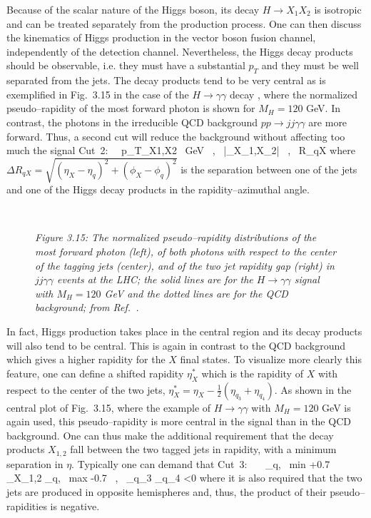 Because of the scalar nature of the Higgs boson, its decay $H \to X_1 X_2$ is
isotropic and can be treated separately from the production process. One can 
then discuss the kinematics of Higgs production in the vector boson fusion 
channel,
independently of the detection channel. Nevertheless, the Higgs decay products
should be observable, i.e. they must have a substantial $p_T$ and they must be
well separated from the jets. The decay products tend to be very central as is
exemplified in Fig.~3.15 in the case of the $H \to \gamma \gamma$ decay 
\cite{Zepp-gamma}, where
the normalized pseudo--rapidity of the most forward photon is shown for
$M_H=120$ GeV. In contrast, the photons in the irreducible QCD background $pp
\to jj\gamma \gamma$ are more forward.  Thus, a second cut will reduce the
background without affecting too much the signal
\beq
{\rm Cut~2}: \ \ p_{T_{X1,X2}} ~{\rm GeV} \  , \  |\eta_{X_1,X_2}| 
 \ ,  \   \Delta R_{qX}  
\eeq
where $\Delta R_{qX} = \sqrt{(\eta_X - \eta_q)^2+ (\phi_X -\phi_q)^2 }$ is the 
separation between one of the jets and one of the Higgs decay products in the 
rapidity--azimuthal angle. 

\begin{figure}[hbtp]
\begin{center}
\leavevmode
\mbox{
 }
\vspace*{-2mm}
\end{center}
{\it Figure 3.15: The normalized pseudo--rapidity distributions of the most 
forward photon (left), of both photons with respect to the center of the tagging
jets (center), and of the two jet rapidity gap  (right) in $jj \gamma \gamma$ 
events at the LHC; the solid lines are for the $H\to \gamma \gamma$ signal with 
$M_H=120$ GeV and the dotted lines are for the QCD background;
from Ref.~\cite{Rainwater-thesis}.}
\vspace*{-3mm}
\end{figure}

In fact, Higgs production takes place in the central region and its decay 
products will also tend to be central. This is again in contrast to the
QCD background which gives a higher rapidity for the $X$ final states.  To 
visualize more clearly this feature, one can define a shifted rapidity
$\eta_X^*$ which is the rapidity of $X$ with respect to the center of
the two jets, $\eta_X^* = \eta_X - \frac{1}{2} (\eta_{q_3} +\eta_{q_4})$. 
As shown in the central plot of Fig.~3.15, where the example of $H \to 
\gamma \gamma$ with $M_H=120$ GeV is again used, this pseudo--rapidity is
more central in the signal than in the QCD background. One can thus make 
the additional requirement that the decay products $X_{1,2}$ fall between 
the two tagged jets in rapidity, with a minimum separation in $ \eta$. 
Typically one can demand that
\beq
{\rm Cut~3}: \ \  \  \eta_{q, \, \rm min} +0.7 \lsim 
\eta_{X_{1,2}} \lsim \eta_{q, \, \rm max} -0.7 \ , \ \eta_{q_3} \cdot 
\eta_{q_4} <0  
\eeq
where it is also required that the two jets are produced in opposite 
hemispheres and, thus, the product of their pseudo--rapidities is negative. \s


